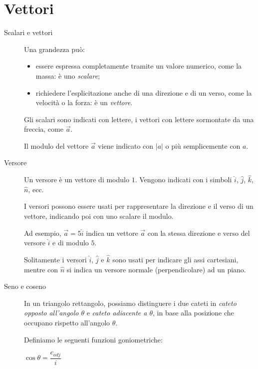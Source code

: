 \documentclass[a4paper,11pt,italian]{article}
\begin{document}
\maketitle
\vspace{8em}
\tableofcontents

\newpage
\section{Vettori}

\begin{description}
  \item[Scalari e vettori] 
  Una grandezza può:
\begin{itemize}
  \item essere espressa completamente tramite un valore numerico, come la massa: è uno \textit{scalare};
  \item richiedere l'esplicitazione anche di una direzione e di un verso, come la velocità o la forza: è un \textit{vettore}.
\end{itemize}
  Gli scalari sono indicati con lettere, i vettori con lettere sormontate da una freccia, come $ \vec{a} $.
  
  Il modulo del vettore $ \vec{a} $ viene indicato con $ |a| $ o più semplicemente con $ a $.
  
  \item[Versore]
  Un versore è un vettore di modulo $ 1 $. Vengono indicati con i simboli $ \hat{i}  $, $ \hat{j} $, $ \hat{k} $, $ \hat{n} $, ecc.
  
  I versori possono essere usati per rappresentare la direzione e il verso di un vettore, indicando poi con uno scalare il modulo.
  
  Ad esempio, $ \vec{a} = 5\hat{i}  $ indica un vettore $ \vec{a} $ con la stessa direzione e verso del versore $ \hat{i} $ e di modulo $ 5 $.
  
  Solitamente i versori $ \hat{i}  $, $ \hat{j} $ e $ \hat{k} $ sono usati per indicare gli assi cartesiani, 
  mentre con $ \hat{n} $ si indica un versore normale (perpendicolare) ad un piano.
  
  \item[Seno e coseno]
  In un triangolo rettangolo, possiamo distinguere i due cateti in \emph{cateto opposto all'angolo $ \theta $} 
  e \emph{cateto adiacente a $ \theta $}, in base alla posizione che occupano rispetto all'angolo $ \theta $.
  
  Definiamo le seguenti funzioni goniometriche:
\begin{multicols}{3}
  \begin{center}
  $ \cos\theta = \dfrac{c_{adj}}{i} $
  

\end{center}
\end{multicols}
\end{description}
\end{document}
